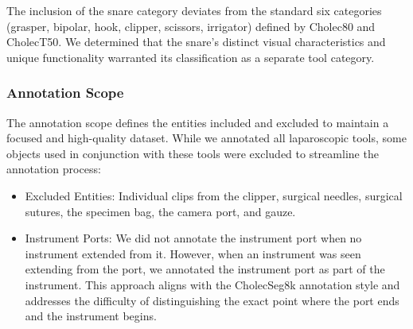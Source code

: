 The inclusion of the snare category deviates from the standard six categories (grasper, bipolar, hook, clipper, scissors, irrigator) defined by Cholec80 and CholecT50. We determined that the snare's distinct visual characteristics and unique functionality warranted its classification as a separate tool category. 




\subsubsection*{Annotation Scope}
The annotation scope defines the entities included and excluded to maintain a focused and high-quality dataset. While we annotated all laparoscopic tools,  some objects used in conjunction with these tools were excluded to streamline the annotation process:
%
\begin{itemize}
    \item Excluded Entities: Individual clips from the clipper, surgical needles, surgical sutures, the specimen bag, the camera port, and gauze.
    \item Instrument Ports: We did not annotate the instrument port when no instrument extended from it. However, when an instrument was seen extending from the port, we annotated the instrument port as part of the instrument. This approach aligns with the CholecSeg8k annotation style and addresses the difficulty of distinguishing the exact point where the port ends and the instrument begins. 
    
\end{itemize}


